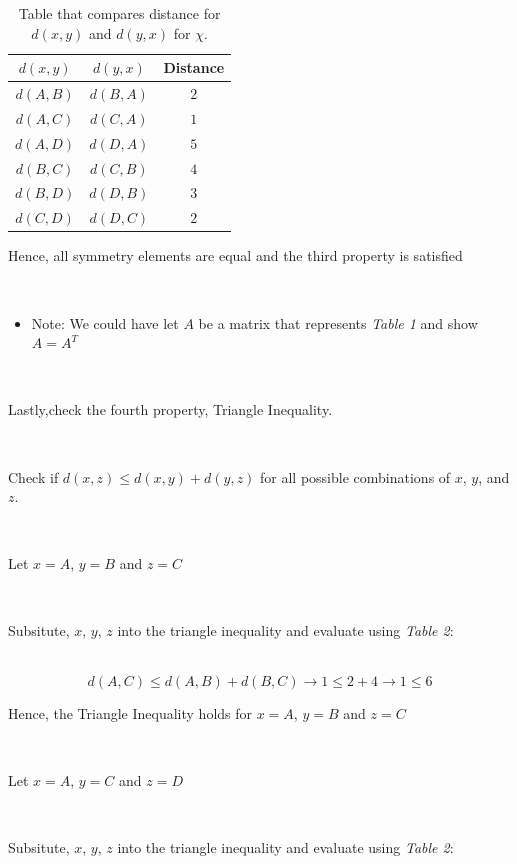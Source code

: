 \documentclass{article}
\begin{document}
\begin{table}[h]
\centering
\begin{tabular}{|c|c|c|}
\hline
$d(x,y)$ & $d(y,x)$ & Distance \\
\hline
$d(A,B)$ & $d(B,A)$  & $2$ \\
$d(A,C)$ & $d(C,A)$  & $1$ \\
$d(A,D)$ & $d(D,A)$  & $5$ \\
$d(B,C)$ & $d(C,B)$  & $4$ \\
$d(B,D)$ & $d(D,B)$  & $3$ \\
$d(C,D)$ & $d(D,C)$  & $2$ \\
\hline
\end{tabular}
\caption{Table that compares distance for $d(x,y)$ and $d(y,x)$ for $\chi$.}
\label{tab:solution}
\end{table}

\parbox{\textwidth}{Hence, all symmetry elements are equal and the third property is satisfied}\\

\begin{itemize}
  \item \parbox{\textwidth}{Note: We could have let $A$ be a matrix that represents \textit{Table 1} and show $A=A^T$}\\
\end{itemize}

\parbox{\textwidth}{Lastly,check the fourth property, Triangle Inequality.}\\

\parbox{\textwidth}{Check if $d(x,z) \leq d(x,y) + d(y,z)$ for all possible combinations of $x$, $y$, and $z$.}\\

\parbox{\textwidth}{Let $x=A$, $y=B$ and $z=C$}\\

\parbox{\textwidth}{Subsitute, $x$, $y$, $z$ into the triangle inequality and evaluate using \textit{Table 2}:}\\

$$d(A,C) \leq d(A,B) + d(B,C) \rightarrow 1 \leq 2 + 4 \rightarrow 1 \leq 6$$

\parbox{\textwidth}{Hence, the Triangle Inequality holds for $x=A$, $y=B$ and $z=C$}\\

\parbox{\textwidth}{Let $x=A$, $y=C$ and $z=D$}\\

\parbox{\textwidth}{Subsitute, $x$, $y$, $z$ into the triangle inequality and evaluate using \textit{Table 2}:}\\
\end{document}
